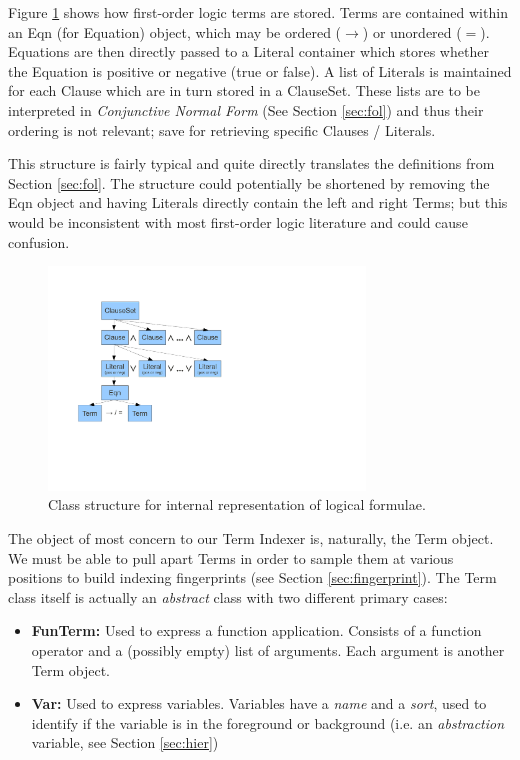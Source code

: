 Figure \ref{fig:expressions} shows how first-order logic terms are stored. Terms
are contained within an Eqn (for Equation) object, which may be ordered ($\to$)
or unordered ($=$). Equations are then directly passed to a Literal container
which stores whether the Equation is positive or negative (true or false). A list
of Literals is maintained for each Clause which are in turn stored in a ClauseSet.
These lists are to be interpreted in \emph{Conjunctive Normal Form} (See Section \ref{sec:fol})
and thus their ordering is not relevant; save for retrieving specific Clauses / Literals.

This structure is fairly typical and quite directly translates the definitions
from Section \ref{sec:fol}. The structure could potentially be shortened by
removing the Eqn object and having Literals directly contain the left and right Terms;
but this would be inconsistent with most first-order logic literature and could cause confusion.

\begin{figure}[H]
  \centering
  \includegraphics[clip,trim=2.5cm 5cm 13cm 2cm,width=0.75\textwidth]{resources/logicstructure}
  \caption
   {Class structure for internal representation of logical formulae.}
   \label{fig:expressions}
\end{figure}

The object of most concern to our Term Indexer is, naturally, the Term object.
We must be able to pull apart Terms in order to sample them at various positions
to build indexing fingerprints (see Section \ref{sec:fingerprint}). The Term
class itself is actually an \emph{abstract} class with two different primary cases:
\begin{itemize}
\item[] \textbf{FunTerm:} Used to express a function application. Consists of
a function operator and a (possibly empty) list of arguments. Each argument
is another Term object.
\item[] \textbf{Var:} Used to express variables. Variables have a \emph{name}
and a \emph{sort}, used to identify if the variable is in the foreground
or background (i.e. an \emph{abstraction} variable, see Section \ref{sec:hier})
\end{itemize}

